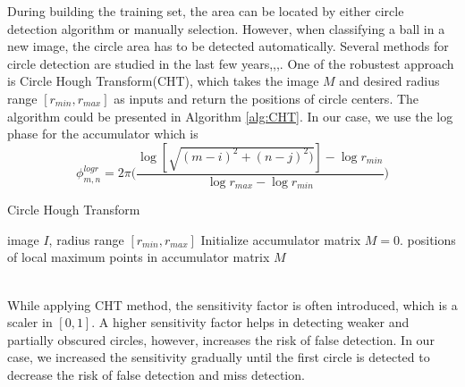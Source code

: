 \documentclass{article}
\begin{document}
During building the training set, the area can be located by either circle detection algorithm or manually selection. However, when classifying a ball in a new image, the circle area has to be detected automatically. Several methods for circle detection are studied in the last few years,\cite{cirDetect1},\cite{cirDetect2},\cite{cirDetect3}. One of the robustest approach is Circle Hough Transform(CHT), which takes the image $M$ and desired radius range $[r_{min},r_{max}]$ as inputs and return the positions of circle centers. The algorithm could be presented in Algorithm \ref{alg:CHT}. In our case, we use the log phase for the accumulator which is
\begin{equation}
\phi_{m,n}^{logr} = 2\pi\Big(\frac{\log{[\sqrt{(m-i)^2+(n-j)^2)}]}-\log{r_{min}}}{\log{r_{max}}-\log{r_{min}}}\Big)
\end{equation}
\begin{algorithm}[tb]
   \caption{Circle Hough Transform}
   \label{alg:CHT}
\begin{algorithmic}
    image $I$, radius range $[r_{min},r_{max}]$
   \STATE Initialize accumulator matrix $M = 0$.
   \ENDIF
   \ENDFOR
   \ENDFOR
    positions of local maximum points in accumulator matrix $M$
\end{algorithmic}
\end{algorithm}\\
While applying CHT method, the sensitivity factor is often introduced, which is a scaler in $[0,1]$. A higher sensitivity factor helps in detecting weaker and partially obscured circles, however, increases the risk of false detection. In our case, we increased the sensitivity gradually until the first circle is detected to decrease the risk of false detection and miss detection.
\end{document}
